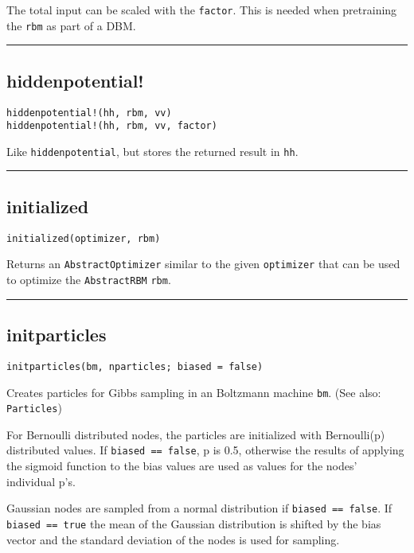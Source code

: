 The total input can be scaled with the \texttt{factor}. This is needed when pretraining the \texttt{rbm} as part of a DBM.

\noindent\rule{\textwidth}{1pt}
\subsection*{hiddenpotential!}  \label{bms_hiddenpotential!}
\begin{verbatim}
hiddenpotential!(hh, rbm, vv)
hiddenpotential!(hh, rbm, vv, factor)
\end{verbatim}
Like \texttt{hiddenpotential}, but stores the returned result in \texttt{hh}.

\noindent\rule{\textwidth}{1pt}
\subsection*{initialized}  \label{bms_initialized}
\begin{verbatim}
initialized(optimizer, rbm)
\end{verbatim}
Returns an \texttt{AbstractOptimizer} similar to the given \texttt{optimizer} that can be used to optimize the \texttt{AbstractRBM} \texttt{rbm}.

\noindent\rule{\textwidth}{1pt}
\subsection*{initparticles}  \label{bms_initparticles}
\begin{verbatim}
initparticles(bm, nparticles; biased = false)
\end{verbatim}
Creates particles for Gibbs sampling in an Boltzmann machine \texttt{bm}. (See also: \texttt{Particles})

For Bernoulli distributed nodes, the particles are initialized with Bernoulli(p) distributed values. If \texttt{biased == false}, p is 0.5, otherwise the results of applying the sigmoid function to the bias values are used as values for the nodes' individual p's.

Gaussian nodes are sampled from a normal distribution if \texttt{biased == false}. If \texttt{biased == true} the mean of the Gaussian distribution is shifted by the bias vector and the standard deviation of the nodes is used for sampling.

